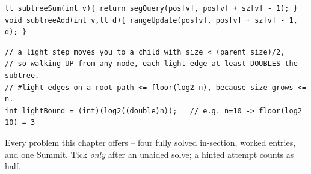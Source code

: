 \begin{lstlisting}[caption={Drill 4 -- subtree as one interval on the pos tree (from lst:c16-subpath)}]
ll subtreeSum(int v){ return segQuery(pos[v], pos[v] + sz[v] - 1); }
void subtreeAdd(int v,ll d){ rangeUpdate(pos[v], pos[v] + sz[v] - 1, d); }
\end{lstlisting}

\begin{lstlisting}[caption={Drill 5 -- light-edge bound arithmetic (from thm:c16-lightedge)}]
// a light step moves you to a child with size < (parent size)/2,
// so walking UP from any node, each light edge at least DOUBLES the subtree.
// #light edges on a root path <= floor(log2 n), because size grows <= n.
int lightBound = (int)(log2((double)n));   // e.g. n=10 -> floor(log2 10) = 3
\end{lstlisting}


Every problem this chapter offers -- four fully solved in-section, worked entries, and one
Summit. Tick \emph{only} after an unaided solve; a hinted attempt counts as half.

